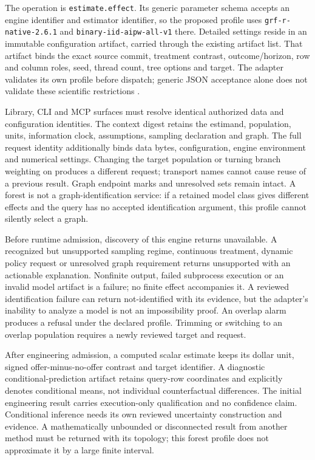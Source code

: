 The operation is \texttt{estimate.effect}. Its generic parameter schema
accepts an engine identifier and estimator identifier, so the proposed
profile uses \texttt{grf-r-native-2.6.1} and
\texttt{binary-iid-aipw-all-v1} there. Detailed settings reside in an
immutable configuration artifact, carried through the existing artifact
list. That artifact binds the exact source commit, treatment contrast,
outcome/horizon, row and column roles, seed, thread count, tree options
and target. The adapter validates its own profile before dispatch;
generic JSON acceptance alone does not validate these scientific
restrictions \citep{exec13_grf_design}.

Library, CLI and MCP surfaces must resolve identical authorized data and
configuration identities. The context digest retains the estimand,
population, units, information clock, assumptions, sampling declaration
and graph. The full request identity additionally binds data bytes,
configuration, engine environment and numerical settings. Changing the
target population or turning branch weighting on produces a different
request; transport names cannot cause reuse of a previous result. Graph
endpoint marks and unresolved sets remain intact. A forest is not a
graph-identification service: if a retained model class gives different
effects and the query has no accepted identification argument, this
profile cannot silently select a graph.

Before runtime admission, discovery of this engine returns unavailable.
A recognized but unsupported sampling regime, continuous treatment,
dynamic policy request or unresolved graph requirement returns
unsupported with an actionable explanation. Nonfinite output, failed
subprocess execution or an invalid model artifact is a failure; no
finite effect accompanies it. A reviewed identification failure can
return not-identified with its evidence, but the adapter's inability to
analyze a model is not an impossibility proof. An overlap alarm produces
a refusal under the declared profile. Trimming or switching to an
overlap population requires a newly reviewed target and request.

After engineering admission, a computed scalar estimate keeps its dollar
unit, signed offer-minus-no-offer contrast and target identifier. A
diagnostic conditional-prediction artifact retains query-row coordinates
and explicitly denotes conditional means, not individual counterfactual
differences. The initial engineering result carries execution-only
qualification and no confidence claim. Conditional inference needs its
own reviewed uncertainty construction and evidence. A mathematically
unbounded or disconnected result from another method must be returned
with its topology; this forest profile does not approximate it by a
large finite interval.

